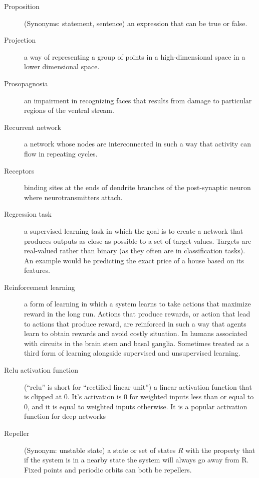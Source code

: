 \begin{description}
\item[Proposition]  (Synonyms: statement, sentence) an expression that can be true or false.

\item[Projection] a way of representing a group of points in a high-dimensional space in a lower dimensional space.

\item[Prosopagnosia] an impairment in recognizing faces that results from damage to particular regions of the ventral stream.


\item[Recurrent network] a network whose nodes are interconnected in such a way that activity can flow in repeating cycles.

\item[Receptors] binding sites at the ends of dendrite branches of the post-synaptic neuron where neurotransmitters attach.


\item[Regression task] a supervised learning task in which the goal is to create a network that produces outputs as close as possible to a set of target values. Targets are real-valued rather than binary (as they often are in classification tasks). An example would be predicting the exact price of a house based on its features.

\item[Reinforcement learning] a form of learning in which a system learns to take actions that maximize reward in the long run.   Actions that produce rewards, or action that lead to actions that produce reward, are reinforced in such a way that agents learn to obtain rewards and avoid costly situation.  In humans associated with circuits in the brain stem and basal ganglia.  Sometimes treated as a third form of learning alongside supervised and unsupervised learning.

\item[Relu activation function] (``relu'' is short for ``rectified linear unit'') a linear activation function that is clipped at  0. It's activation is 0 for weighted inputs less than or equal to 0, and it is equal to weighted inputs otherwise. It is a popular activation function for deep networks

\item[Repeller] (Synonym: unstable state) a state or set of states $R$ with the property that if the system is in a nearby state the system will always go away from R. Fixed points and periodic orbits can both be repellers.


\end{description}
